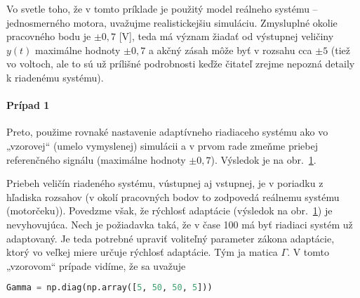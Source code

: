 \documentclass[a4paper, 10pt, ]{article}
\begin{document}
Vo svetle toho, že v tomto príklade je použitý model reálneho systému -- jednosmerného motora, uvažujme realistickejšiu simuláciu. Zmysluplné okolie pracovného bodu je $\pm 0,7$ [V], teda má význam žiadať od výstupnej veličiny $y(t)$ maximálne hodnoty $\pm 0,7$ a akčný zásah môže byť v rozsahu cca $\pm 5$ (tiež vo voltoch, ale to sú už prílišné podrobnosti keďže čitateľ zrejme nepozná detaily k riadenému systému).














\paragraph{Prípad 1}



Preto, použime rovnaké nastavenie adaptívneho riadiaceho systému ako vo „vzorovej“ (umelo vymyslenej) simulácii a v prvom rade zmeňme priebej referenčného signálu (maximálne hodnoty $\pm 0,7$). Výsledok je na obr.~\ref{figsc_ar06_MRAC_2}.




Priebeh veličín riadeného systému, vústupnej aj vstupnej, je v poriadku z hľadiska rozsahov (v okolí pracovných bodov to zodpovedá reálnemu systému (motorčeku)). Povedzme však, že rýchlosť adaptácie (výsledok na obr.~\ref{figsc_ar06_MRAC_2}) je nevyhovujúca. Nech je požiadavka taká, že v čase 100 má byť riadiaci systém už adaptovaný. Je teda potrebné upraviť voliteľný parameter zákona adaptácie, ktorý vo veľkej miere určuje rýchlosť adaptácie. Tým ja matica $\Gamma$. V tomto „vzorovom“ prípade vidíme, že sa uvažuje
\begin{lstlisting}[language=Python,
                    numbers=none,
                    ]
Gamma = np.diag(np.array([5, 50, 50, 5]))
\end{lstlisting}












\begin{figure}[!t]
	\centering

    \vspace{-3mm}


    \vspace{-2mm}

	\caption{}
	\label{figsc_ar06_MRAC_2}


    \vspace{-2mm}

\end{figure}
\end{document}
